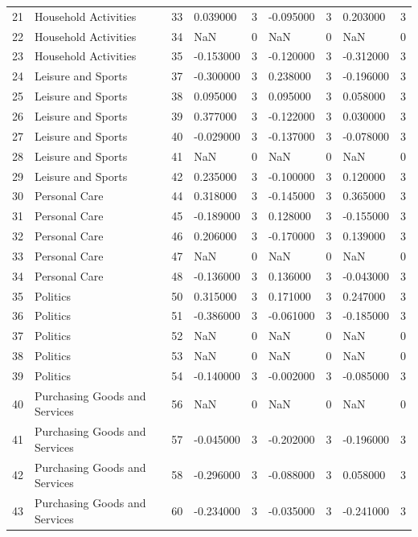 \begin{tabular}{lllllllll}
21 & Household Activities & 33 & 0.039000 & 3 & -0.095000 & 3 & 0.203000 & 3 \\
22 & Household Activities & 34 & NaN & 0 & NaN & 0 & NaN & 0 \\
23 & Household Activities & 35 & -0.153000 & 3 & -0.120000 & 3 & -0.312000 & 3 \\
24 & Leisure and Sports & 37 & -0.300000 & 3 & 0.238000 & 3 & -0.196000 & 3 \\
25 & Leisure and Sports & 38 & 0.095000 & 3 & 0.095000 & 3 & 0.058000 & 3 \\
26 & Leisure and Sports & 39 & 0.377000 & 3 & -0.122000 & 3 & 0.030000 & 3 \\
27 & Leisure and Sports & 40 & -0.029000 & 3 & -0.137000 & 3 & -0.078000 & 3 \\
28 & Leisure and Sports & 41 & NaN & 0 & NaN & 0 & NaN & 0 \\
29 & Leisure and Sports & 42 & 0.235000 & 3 & -0.100000 & 3 & 0.120000 & 3 \\
30 & Personal Care & 44 & 0.318000 & 3 & -0.145000 & 3 & 0.365000 & 3 \\
31 & Personal Care & 45 & -0.189000 & 3 & 0.128000 & 3 & -0.155000 & 3 \\
32 & Personal Care & 46 & 0.206000 & 3 & -0.170000 & 3 & 0.139000 & 3 \\
33 & Personal Care & 47 & NaN & 0 & NaN & 0 & NaN & 0 \\
34 & Personal Care & 48 & -0.136000 & 3 & 0.136000 & 3 & -0.043000 & 3 \\
35 & Politics & 50 & 0.315000 & 3 & 0.171000 & 3 & 0.247000 & 3 \\
36 & Politics & 51 & -0.386000 & 3 & -0.061000 & 3 & -0.185000 & 3 \\
37 & Politics & 52 & NaN & 0 & NaN & 0 & NaN & 0 \\
38 & Politics & 53 & NaN & 0 & NaN & 0 & NaN & 0 \\
39 & Politics & 54 & -0.140000 & 3 & -0.002000 & 3 & -0.085000 & 3 \\
40 & Purchasing Goods and Services & 56 & NaN & 0 & NaN & 0 & NaN & 0 \\
41 & Purchasing Goods and Services & 57 & -0.045000 & 3 & -0.202000 & 3 & -0.196000 & 3 \\
42 & Purchasing Goods and Services & 58 & -0.296000 & 3 & -0.088000 & 3 & 0.058000 & 3 \\
43 & Purchasing Goods and Services & 60 & -0.234000 & 3 & -0.035000 & 3 & -0.241000 & 3 \\

\end{tabular}
